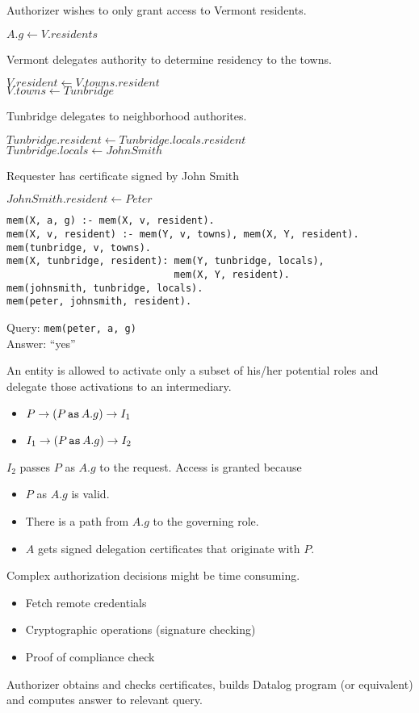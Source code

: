 \documentclass[landscape]{slides}
\begin{document}
Authorizer wishes to only grant access to Vermont residents.

$A.g \leftarrow V.residents$

Vermont delegates authority to determine residency to the towns.

$V.resident \leftarrow V.towns.resident$\\
$V.towns \leftarrow Tunbridge$

Tunbridge delegates to neighborhood authorites.

$Tunbridge.resident  \leftarrow Tunbridge.locals.resident$\\
$Tunbridge.locals \leftarrow JohnSmith$

Requester has certificate signed by John Smith

$JohnSmith.resident \leftarrow Peter$
\stopslide

\begin{verbatim}
mem(X, a, g) :- mem(X, v, resident).
mem(X, v, resident) :- mem(Y, v, towns), mem(X, Y, resident).
mem(tunbridge, v, towns).
mem(X, tunbridge, resident): mem(Y, tunbridge, locals),
                             mem(X, Y, resident).
mem(johnsmith, tunbridge, locals).
mem(peter, johnsmith, resident).
\end{verbatim}
Query: \texttt{mem(peter, a, g)}\\
Answer: ``yes''
\stopslide

An entity is allowed to activate only a subset of his/her potential roles and delegate those activations to an intermediary.
\begin{itemize}
\item $P \rightarrow (P\, \mbox{\texttt{as}}\, A.g)\rightarrow I_1$
\item $I_1 \rightarrow (P\, \mbox{\texttt{as}}\, A.g)\rightarrow I_2$
\end{itemize}
$I_2$ passes $P$ as $A.g$ to the request. Access is granted because
\begin{itemize}
\item $P$ as $A.g$ is valid.
\item There is a path from $A.g$ to the governing role.
\item $A$ gets signed delegation certificates that originate with $P$.
\end{itemize}
\stopslide

Complex authorization decisions might be time consuming.
\begin{itemize}
\item Fetch remote credentials
\item Cryptographic operations (signature checking)
\item Proof of compliance check
\end{itemize}
Authorizer obtains and checks certificates, builds Datalog program (or equivalent) and computes answer to relevant query.
\stopslide
\end{document}
